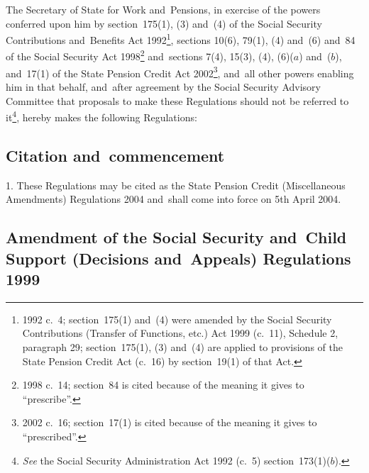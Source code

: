 \documentclass[12pt,a4paper]{article}
\title{\regstitle}
\author{S.I.\ 2004 No.\ 647}
\date{Made
8th March 2004\\
Laid before Parliament
15th March 2004\\
Coming into~force
5th April 2004
}
\begin{document}
\maketitle

\enlargethispage{\baselineskip}

\noindent
The Secretary of State for Work and~Pensions, in exercise of the powers conferred upon him by section~175(1), (3) and~(4) of the Social Security Contributions and~Benefits Act 1992\footnote{1992 c.~4; section~175(1) and~(4) were amended by the Social Security Contributions (Transfer of Functions, etc.) Act 1999 (c.~11), Schedule 2, paragraph 29; section~175(1), (3) and~(4) are applied to provisions of the State Pension Credit Act (c.~16) by section~19(1) of that Act.}, sections 10(6), 79(1), (4) and~(6) and~84 of the Social Security Act 1998\footnote{1998 c.~14; section~84 is cited because of the meaning it gives to “prescribe”.} and~sections 7(4), 15(3), (4), (6)($a$)  and~($b$), and~17(1) of the State Pension Credit Act 2002\footnote{2002 c.~16; section~17(1) is cited because of the meaning it gives to “prescribed”.}, and~all other powers enabling him in that behalf, and~after agreement by the Social Security Advisory Committee that proposals to make these Regulations should not be referred to it\footnote{\emph{See} the Social Security Administration Act 1992 (c.~5) section~173(1)($b$).}, hereby makes the following Regulations: 

{\sloppy

\tableofcontents

}

\bigskip

\setcounter{secnumdepth}{-2}

\subsection[1. Citation and~commencement]{Citation and~commencement}

1.  These Regulations may be cited as the State Pension Credit (Miscellaneous Amendments) Regulations 2004 and~shall come into force on 5th April 2004.

\subsection[2. Amendment of the Social Security and~Child Support (Decisions and~Appeals) Regulations 1999]{Amendment of the Social Security and~Child Support (Decisions and~Appeals) Regulations 1999}
\end{document}
